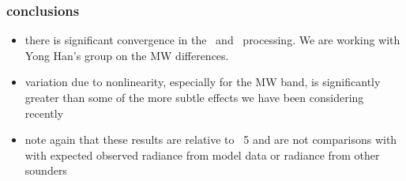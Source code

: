 \documentclass[11pt]{beamer}
\begin{document}
\begin{frame}
\frametitle{conclusions}

\begin{itemize}

  \item there is significant convergence in the \ccast\ and
    \noaa\ processing.  We are working with Yong Han's group on the
    MW differences.

  \item variation due to nonlinearity, especially for the MW band, is
    significantly greater than some of the more subtle effects we have
    been considering recently

  \item note again that these results are relative to \fov\ 5 and
    are not comparisons with with expected observed radiance from
    model data or radiance from other sounders

\end{itemize}

\end{frame}
\end{document}
